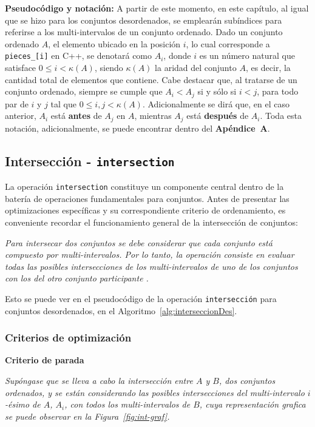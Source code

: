 \textbf{Pseudocódigo y notación:} A partir de este momento, en este capítulo, al igual que se hizo para los conjuntos desordenados, se emplearán subíndices para referirse a los multi-intervalos de un conjunto ordenado. Dado un conjunto ordenado $A$, el elemento ubicado en la posición $i$, lo cual corresponde a \texttt{pieces\_[i]} en C++, se denotará como \textbf{$A_i$}, donde $i$ es un número natural que satisface $0 \leq i < \kappa(A)$, siendo $\kappa(A)$ la aridad del conjunto $A$, es decir, la cantidad total de elementos que contiene. Cabe destacar que, al tratarse de un conjunto ordenado, siempre se cumple que $A_i < A_j$ si y sólo si $i < j$, para todo par de $i$ y $j$ tal que $0  \leq i, j < \kappa(A)$. Adicionalmente se dirá que, en el caso anterior, $A_i$ está \textbf{antes} de $A_j$ en $A$, mientras $A_j$ está \textbf{después} de $A_i$. Toda esta notación, adicionalmente, se puede encontrar dentro del \textbf{Apéndice~A}.

\subsection{Intersección - \texttt{intersection}}\label{sec:opts-int}

La operación \texttt{intersection} constituye un componente central dentro de la batería de operaciones fundamentales para conjuntos. Antes de presentar las optimizaciones específicas y su correspondiente criterio de ordenamiento, es conveniente recordar el funcionamiento general de la intersección de conjuntos:

\begin{center}
\textit{Para intersecar dos conjuntos se debe considerar que cada conjunto está compuesto por multi-intervalos. Por lo tanto, la operación consiste en evaluar todas las posibles intersecciones de los multi-intervalos de uno de los conjuntos con los del otro conjunto participante .}
\end{center}

Esto se puede ver en el pseudocódigo de la operación \texttt{intersección} para conjuntos desordenados, en el Algoritmo~\ref{alg:interseccionDes}.
\subsubsection{Criterios de optimización}

{\bf Criterio de parada}

\begin{center}
    \textit{Supóngase que se lleva a cabo la intersección entre $A$ y $B$, dos conjuntos ordenados, y se están considerando las posibles intersecciones del multi-intervalo \( i \)-ésimo de $A$, \( A_i \), con todos los multi-intervalos de $B$, cuya representación grafica se puede observar en la Figura~\ref{fig:int-graf}.}
\end{center}

